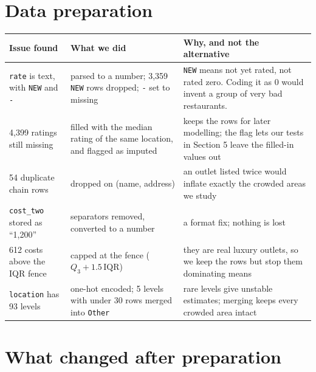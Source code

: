 \documentclass[10pt,a4paper,twocolumn]{article}
\newif\ifshowhints
\newcommand{\hint}[1]{\ifshowhints{\footnotesize\itshape\color{hintgrey}#1\par}\fi}
\newcommand{\eg}[1]{\textcolor{eg}{#1}}
\newcommand{\code}[1]{\texttt{#1}}
\begin{document}
\section{Data preparation}
\hint{How did you prepare your data (encoding, outliers, missing values, duplicates), and why do
you follow such steps? One row per step; the ``why'' matters most.}

{\footnotesize
\begin{tabularx}{\linewidth}{@{}L{1.9cm} L{2.3cm} Y@{}}
\toprule
\textbf{Issue found} & \textbf{What we did} & \textbf{Why, and not the alternative} \\
\midrule
\eg{\code{rate} is text, with \code{NEW} and \code{-}}
 & \eg{parsed to a number; 3{,}359 \code{NEW} rows dropped; \code{-} set to missing}
 & \eg{\code{NEW} means not yet rated, not rated zero. Coding it as 0 would invent a group of
   very bad restaurants.} \\
\eg{4{,}399 ratings still missing}
 & \eg{filled with the median rating of the same location, and flagged as imputed}
 & \eg{keeps the rows for later modelling; the flag lets our tests in Section 5 leave the
   filled-in values out} \\
\eg{54 duplicate chain rows}
 & \eg{dropped on (name, address)}
 & \eg{an outlet listed twice would inflate exactly the crowded areas we study} \\
\eg{\code{cost\_two} stored as ``1,200''}
 & \eg{separators removed, converted to a number}
 & \eg{a format fix; nothing is lost} \\
\eg{612 costs above the IQR fence}
 & \eg{capped at the fence ($Q_3+1.5\,\mathrm{IQR}$)}
 & \eg{they are real luxury outlets, so we keep the rows but stop them dominating means} \\
\eg{\code{location} has 93 levels}
 & \eg{one-hot encoded; 5 levels with under 30 rows merged into \code{Other}}
 & \eg{rare levels give unstable estimates; merging keeps every crowded area intact} \\
\bottomrule
\end{tabularx}}

\section{What changed after preparation}
\hint{What are the changes you got after data preparation? Give before-and-after observations.}
\end{document}
